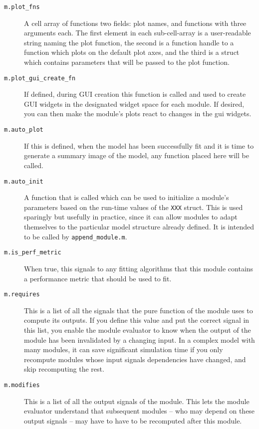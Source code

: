 \documentclass[letterpaper]{report}
\newcommand{\matlab}[1]{\texttt{#1}}
\begin{document}
\begin{description}

\item [\matlab{m.plot\_fns}] A cell array of functions two fields: plot names, and functions with three arguments each. The first element in each sub-cell-array is a user-readable string naming the plot function, the second is a function handle to a function which plots on the default plot axes, and the third is a struct which contains parameters that will be passed to the plot function.  

\item [\matlab{m.plot\_gui\_create\_fn}] If defined, during GUI creation this function is called and used to create GUI widgets in the designated widget space for each module. If desired, you can then make the module's plots react to changes in the gui widgets. 

\item [\matlab{m.auto\_plot}] If this is defined, when the model has been successfully fit and it is time to generate a summary image of the model, any function placed here will be called.

\item [\matlab{m.auto\_init}] A function that is called which can be used to initialize a module's parameters based on the run-time values of the \matlab{XXX} struct. This is used sparingly but usefully in practice, since it can allow modules to adapt themselves to the particular model structure already defined. It is intended to be called by \matlab{append\_module.m}. 

\item [\matlab{m.is\_perf\_metric}] When true, this signals to any fitting algorithms that this module contains a performance metric that should be used to fit. 

\item [\matlab{m.requires}] This is a list of all the signals that the pure function of the module uses to compute its outputs. If you define this value and put the correct signal in this list, you enable the module evaluator to know when the output of the module has been invalidated by a changing input. In a complex model with many modules, it can save significant simulation time if you only recompute modules whose input signals dependencies have changed, and skip recomputing the rest. 

\item [\matlab{m.modifies}] This is a list of all the output signals of the module. This lets the module evaluator understand that subsequent modules -- who may depend on these output signals -- may have to have to be recomputed after this module. 

\end{description}
\end{document}
